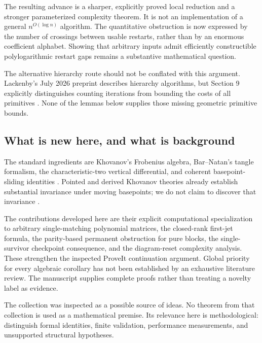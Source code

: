 \documentclass[11pt]{article}
\theoremstyle{definition}\newtheorem{definition}[theorem]{Definition}\newtheorem{example}[theorem]{Example}
\theoremstyle{remark}\newtheorem{remark}[theorem]{Remark}
\newcommand{\code}[1]{\texttt{\detokenize{#1}}}
\begin{document}
The resulting advance is a sharper, explicitly proved local reduction and a stronger parameterized complexity theorem. It is not an implementation of a general $n^{O(\log n)}$ algorithm. The quantitative obstruction is now expressed by the number of crossings between usable restarts, rather than by an enormous coefficient alphabet. Showing that arbitrary inputs admit efficiently constructible polylogarithmic restart gaps remains a substantive mathematical question.

The alternative hierarchy route should not be conflated with this argument. Lackenby's July 2026 preprint describes hierarchy algorithms, but Section 9 explicitly distinguishes counting iterations from bounding the costs of all primitives \cite{Lackenby}. None of the lemmas below supplies those missing geometric primitive bounds.

\subsection{What is new here, and what is background}
The standard ingredients are Khovanov's Frobenius algebra, Bar--Natan's tangle formalism, the characteristic-two vertical differential, and coherent basepoint-sliding identities \cite{Khovanov,BarNatan,Shumakovitch,Nahm}. Pointed and derived Khovanov theories already establish substantial invariance under moving basepoints; we do not claim to discover that invariance \cite{BLS,Nahm}.

The contributions developed here are their explicit computational specialization to arbitrary single-matching polynomial matrices, the closed-rank first-jet formula, the parity-based permanent obstruction for pure blocks, the single-survivor checkpoint consequence, and the diagram-reset complexity analysis. These strengthen the inspected ProveIt continuation argument. Global priority for every algebraic corollary has not been established by an exhaustive literature review. The manuscript supplies complete proofs rather than treating a novelty label as evidence.

The \code{openai/math} collection was inspected as a possible source of ideas. No theorem from that collection is used as a mathematical premise. Its relevance here is methodological: distinguish formal identities, finite validation, performance measurements, and unsupported structural hypotheses.
\end{document}

